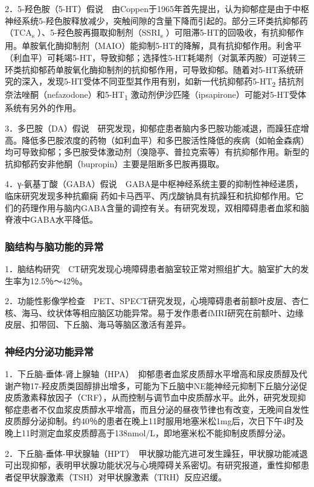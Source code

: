 2．5-羟色胺（5-HT）假说　由Coppen于1965年首先提出，认为抑郁症是由于中枢神经系统5-羟色胺释放减少，突触间隙的含量下降而引起的。部分三环类抗抑郁药（TCA\textsubscript{s}
）、5-羟色胺再摄取抑制剂（SSRI\textsubscript{s}
）可阻滞5-HT的回吸收，有抗抑郁作用。单胺氧化酶抑制剂（MAIO）能抑制5-HT的降解，具有抗抑郁作用。利舍平（利血平）可耗竭5-HT，导致抑郁；选择性5-HT耗竭剂（对氯苯丙胺）可逆转三环类抗抑郁药单胺氧化酶抑制剂的抗抑郁作用，可导致抑郁。随着对5-HT系统研究的深入，发现5-HT受体不同亚型其作用有别，如新一代抗抑郁药5-HT\textsubscript{2}
拮抗剂奈法唑酮（nefazodone）和5-HT\textsubscript{1}
激动剂伊沙匹隆（ipsapirone）可能对5-HT受体系统有另外的作用。

3．多巴胺（DA）假说　研究发现，抑郁症患者脑内多巴胺功能减退，而躁狂症增高。降低多巴胺浓度的药物（如利血平）和多巴胺活性降低的疾病（如帕金森病）均可导致抑郁；多巴胺受体激动剂（溴隐亭、普拉克索等）有抗抑郁作用。新型的抗抑郁药安非他酮（bupropin）主要是阻断多巴胺再摄取。

4．γ-氨基丁酸（GABA）假说　GABA是中枢神经系统主要的抑制性神经递质，临床研究发现多种抗癫痫
药如卡马西平、丙戊酸钠具有抗躁狂和抗抑郁作用。它们的药理作用与脑内GABA含量的调控有关。有研究发现，双相障碍患者血浆和脑脊液中GABA水平降低。

\subsubsection{脑结构与脑功能的异常}

1．脑结构研究　CT研究发现心境障碍患者脑室较正常对照组扩大。脑室扩大的发生率为12.5％～42％。

2．功能性影像学检查　PET、SPECT研究发现，心境障碍患者前额叶皮层、杏仁核、海马、纹状体等相应脑区功能异常。易于发作患者fMRI研究在前额叶、边缘皮层、扣带回、下丘脑、海马等脑区激活有差异。

\subsubsection{神经内分泌功能异常}

1．下丘脑-垂体-肾上腺轴（HPA）　抑郁患者血浆皮质醇水平增高和尿皮质醇及代谢产物17-羟皮质类固醇排出增多，可能为下丘脑中NE能神经元抑制下丘脑分泌促皮质激素释放因子（CRF），从而控制与调节血中皮质醇水平。此外，研究发现抑郁症患者不仅血浆皮质醇水平增高，而且分泌的昼夜节律也有改变，无晚间自发性皮质醇分泌抑制。约40％的患者在晚上11时服用地塞米松1mg后，次日下午4时及晚上11时测定血浆皮质醇高于138nmol/L，即地塞米松不能抑制皮质醇分泌。

2．下丘脑-垂体-甲状腺轴（HPT）　甲状腺功能亢进可发生躁狂，甲状腺功能减退可出现抑郁，表明甲状腺功能状况与心境障碍关系密切。有研究报道，重性抑郁患者促甲状腺激素（TSH）对甲状腺激素（TRH）反应迟缓。

